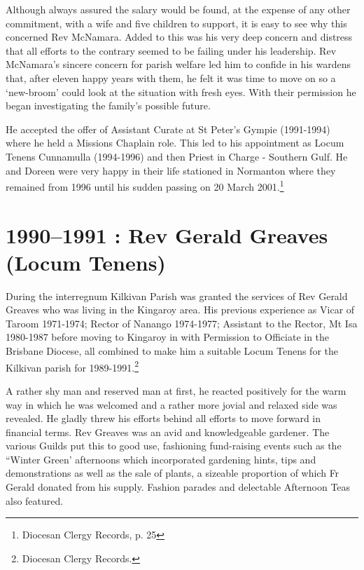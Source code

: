 Although always assured the salary would be found, at the expense of any other commitment, with a wife and five children to support, it is easy to see why this concerned Rev McNamara. Added to this was his very deep concern and distress that all efforts to the contrary seemed to be failing under his leadership. Rev McNamara's sincere concern for parish welfare led him to confide in his wardens that, after eleven happy years with them, he felt it was time to move on so a `new-broom' could look at the situation with fresh eyes. With their permission he began investigating the family's possible future.

He accepted the offer of Assistant Curate at St Peter's Gympie (1991-1994) where he held a Missions Chaplain role. This led to his appointment as Locum Tenens Cunnamulla (1994-1996) and then Priest in Charge - Southern Gulf. He and Doreen were very happy in their life stationed in Normanton where they remained from 1996 until his sudden passing on 20 March 2001.\footnote{Diocesan Clergy Records, p. 25}

\hypertarget{rev-gerald-greaves-locum-tenens}{%
\section{1990--1991 : Rev Gerald Greaves (Locum Tenens)}\label{rev-gerald-greaves-locum-tenens}}

During the interregnum Kilkivan Parish was granted the services of Rev Gerald Greaves who was living in the Kingaroy area. His previous experience as Vicar of Taroom 1971-1974; Rector of Nanango 1974-1977; Assistant to the Rector, Mt Isa 1980-1987 before moving to Kingaroy in with Permission to Officiate in the Brisbane Diocese, all combined to make him a suitable Locum Tenens for the Kilkivan parish for 1989-1991.\footnote{Diocesan Clergy Records.}

A rather shy man and reserved man at first, he reacted positively for the warm way in which he was welcomed and a rather more jovial and relaxed side was revealed. He gladly threw his efforts behind all efforts to move forward in financial terms. Rev Greaves was an avid and knowledgeable gardener. The various Guilds put this to good use, fashioning fund-raising events such as the ``Winter Green' afternoons which incorporated gardening hints, tips and demonstrations as well as the sale of plants, a sizeable proportion of which Fr Gerald donated from his supply. Fashion parades and delectable Afternoon Teas also featured.


